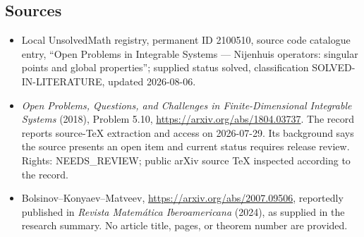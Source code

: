 \documentclass[11pt]{article}
\begin{document}
\subsection{Sources}
\begin{itemize}
\item Local UnsolvedMath registry, permanent ID 2100510, source code catalogue entry, ``Open Problems in Integrable Systems --- Nijenhuis operators: singular points and global properties''; supplied status solved, classification SOLVED-IN-LITERATURE, updated 2026-08-06.
\item \emph{Open Problems, Questions, and Challenges in Finite-Dimensional Integrable Systems} (2018), Problem 5.10, \url{https://arxiv.org/abs/1804.03737}. The record reports source-TeX extraction and access on 2026-07-29. Its background says the source presents an open item and current status requires release review. Rights: NEEDS\_REVIEW; public arXiv source TeX inspected according to the record.
\item Bolsinov--Konyaev--Matveev, \url{https://arxiv.org/abs/2007.09506}, reportedly published in \emph{Revista Matem\'atica Iberoamericana} (2024), as supplied in the research summary. No article title, pages, or theorem number are provided.
\end{itemize}
\end{document}
